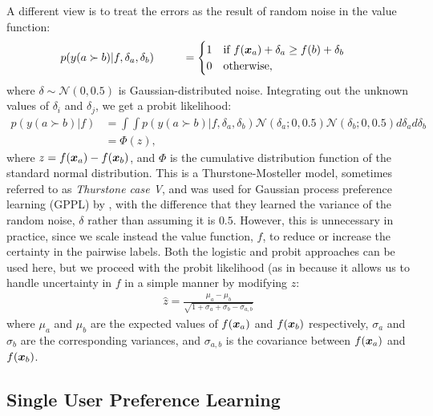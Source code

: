 A different view is to treat the errors as the result of random noise in the value function:
\begin{align}
 p(y(a \succ b) | f, \delta_{a}, \delta_{b} )  
 \hspace{0.9cm} & = \begin{cases}
 1 & \text{if }f(\boldsymbol x_a) + \delta_{a} \geq f(b) + \delta_{b} \\
 0 & \text{otherwise,}
 \end{cases} &
 \label{eq:thurstone}
\end{align}
where $\delta \sim \mathcal{N}(0, 0.5)$ is Gaussian-distributed noise.
Integrating out the unknown values of $\delta_{i}$ and $\delta_{j}$,
we get a probit likelihood:
\begin{align}
p( y(a \succ b) | f ) 
& = \int\int p( y(a \succ b) | f, \delta_{a}, \delta_{b} ) \mathcal{N}(\delta_{a}; 0, 0.5)\mathcal{N}(\delta_{b}; 0, 0.5) d\delta_{a} d\delta_{b} &\nonumber\\
& = \Phi\left( z \right), 
\label{eq:plphi}
\end{align}
where $z = f(\boldsymbol x_a) - f(\boldsymbol x_b)$,
and $\Phi$ is the cumulative distribution function of the standard normal distribution. 
This is a Thurstone-Mosteller model, sometimes referred to as \emph{Thurstone case V}, and was used for Gaussian process preference learning (GPPL) 
by \citet{chu2005preference}, with the difference that they learned the variance of the random noise, $\delta$
rather than assuming it is $0.5$. However, this is unnecessary in practice, since we 
scale instead the value function, $f$, to reduce or increase the certainty in the pairwise labels.
Both the logistic and probit approaches can be used here, but we proceed with
the probit likelihood (as in \citep{herbrich2007trueskill,chu2005preference}
because it allows us to handle uncertainty in $f$ in a simple manner %
by modifying $z$:
\begin{align}
\hat{z} = \frac{\mu_a - \mu_b}{\sqrt{1 + \sigma_a + \sigma_b - \sigma_{a,b}} }
\end{align}
where $\mu_a$ and $\mu_b$ are the expected values of $f(\boldsymbol x_a)$ and $f(\boldsymbol x_b)$ respectively, 
$\sigma_a$ and $\sigma_b$ are the corresponding variances,
and $\sigma_{a,b}$ is the covariance between $f(\boldsymbol x_a)$ and $f(\boldsymbol x_b)$.

\subsection{Single User Preference Learning}

